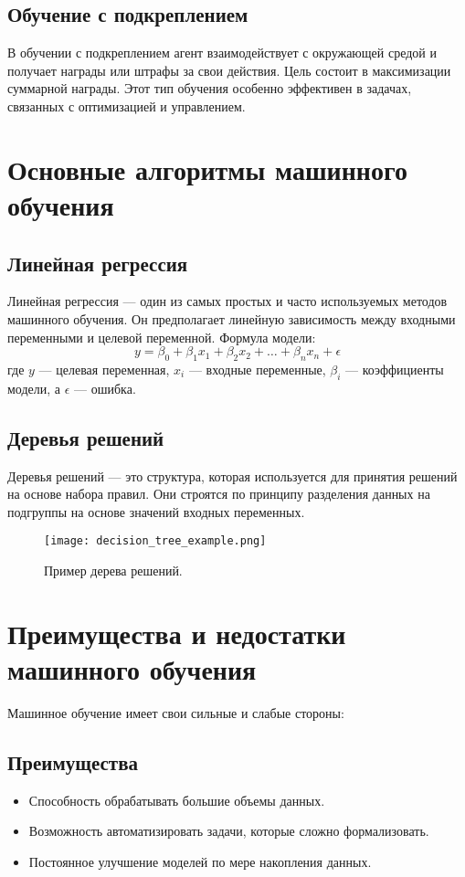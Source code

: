 \documentclass[a4paper,12pt]{article}
\begin{document}
\subsection{Обучение с подкреплением}
В обучении с подкреплением агент взаимодействует с окружающей средой и получает награды или штрафы за свои действия. Цель состоит в максимизации суммарной награды. Этот тип обучения особенно эффективен в задачах, связанных с оптимизацией и управлением.

\section{Основные алгоритмы машинного обучения}

\subsection{Линейная регрессия}
Линейная регрессия — один из самых простых и часто используемых методов машинного обучения. Он предполагает линейную зависимость между входными переменными и целевой переменной. Формула модели:
\[
y = \beta_0 + \beta_1 x_1 + \beta_2 x_2 + \ldots + \beta_n x_n + \epsilon
\]
где \(y\) — целевая переменная, \(x_i\) — входные переменные, \(\beta_i\) — коэффициенты модели, а \(\epsilon\) — ошибка.

\subsection{Деревья решений}
Деревья решений — это структура, которая используется для принятия решений на основе набора правил. Они строятся по принципу разделения данных на подгруппы на основе значений входных переменных.

\begin{figure}[h]
    \centering
    \texttt{[image: decision\_tree\_example.png]}
    \caption{Пример дерева решений.}
\end{figure}

\section{Преимущества и недостатки машинного обучения}
Машинное обучение имеет свои сильные и слабые стороны:

\subsection{Преимущества}
\begin{itemize}
    \item Способность обрабатывать большие объемы данных.
    \item Возможность автоматизировать задачи, которые сложно формализовать.
    \item Постоянное улучшение моделей по мере накопления данных.
\end{itemize}
\end{document}
